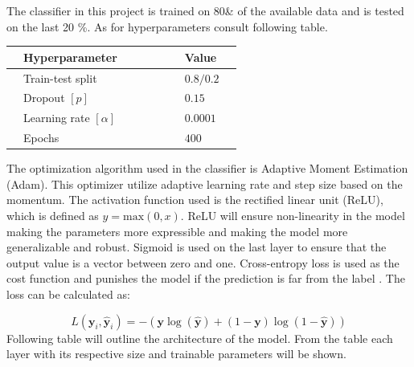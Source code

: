 \documentclass[12pt, fleqn, titlepage]{article}
\begin{document}
	The classifier in this project is trained on 80\& of the available data and is tested on the last 20 \%. As for hyperparameters consult following table.
	
	\begin{table}[H]\label{hyperparams}
		\centering
		\begin{tabular}{l l l l l l l l l}
			\toprule
			& \textbf{Hyperparameter}           &&&&& & \textbf{Value}    & \\ \midrule
			& Train-test split         &&&&& & $0.8/0.2$& \\
			& Dropout $[p]$            &&&&& & $0.15$    & \\ 
			& Learning rate $[\alpha]$ &&&&& & $0.0001$  & \\ 
			& Epochs                   &&&&& & $400$    & \\  \bottomrule
		\end{tabular}
	\end{table}
	
	
	 The optimization algorithm used in the classifier is Adaptive Moment Estimation (Adam). This optimizer utilize adaptive learning rate and step size based on the momentum. The activation function used is the rectified linear unit (ReLU), which is defined as $ y = \text{max}(0,x) $. ReLU will ensure non-linearity in the model making the parameters more expressible and making the model more generalizable and robust. Sigmoid is used on the last layer to ensure that the output value is a vector between zero and one. Cross-entropy loss is used as the cost function and punishes the model if the prediction is far from the label \cite {dl}. The loss can be calculated as:
	 
	\begin{equation*}\label{key}
		L\left(\boldsymbol{y}_{i}, \hat{\boldsymbol{y}}_{i}\right) = -(\mathbf y \log (\mathbf {\hat y})+(1-\mathbf  y) \log (1-\mathbf {\hat y}))
	\end{equation*}
	\noindent
	Following table will outline the architecture of the model. From the table each layer with its respective size and trainable parameters will be shown.
	
\end{document}
